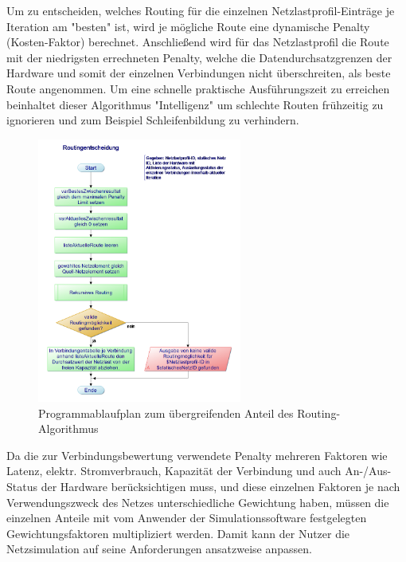\documentclass[12pt,titlepage]{article}
\begin{document}
Um zu entscheiden, welches Routing für die einzelnen Netzlastprofil-Einträge je Iteration am "besten" ist, wird je mögliche Route eine dynamische Penalty (Kosten-Faktor) berechnet. Anschließend wird für das Netzlastprofil die Route mit der niedrigsten errechneten Penalty, welche die Datendurchsatzgrenzen der Hardware und somit der einzelnen Verbindungen nicht überschreiten, als beste Route angenommen. Um eine schnelle praktische Ausführungszeit zu erreichen beinhaltet dieser Algorithmus "Intelligenz" um schlechte Routen frühzeitig zu ignorieren und zum Beispiel Schleifenbildung zu verhindern.

\begin{figure}[!h]
	\centering
	\includegraphics[width=0.6\textwidth]{2Routingentscheidung}
	\caption{Programmablaufplan zum übergreifenden Anteil des Routing-Algorithmus}
	\label{fig:2Routingentscheidung}
\end{figure}

Da die zur Verbindungsbewertung verwendete Penalty mehreren Faktoren wie Latenz, elektr. Stromverbrauch, Kapazität der Verbindung und auch An-/Aus-Status der Hardware berücksichtigen muss, und diese einzelnen Faktoren je nach Verwendungszweck des Netzes unterschiedliche Gewichtung haben, müssen die einzelnen Anteile mit vom Anwender der Simulationssoftware festgelegten Gewichtungsfaktoren multipliziert werden. Damit kann der Nutzer die Netzsimulation auf seine Anforderungen ansatzweise anpassen.
\end{document}
